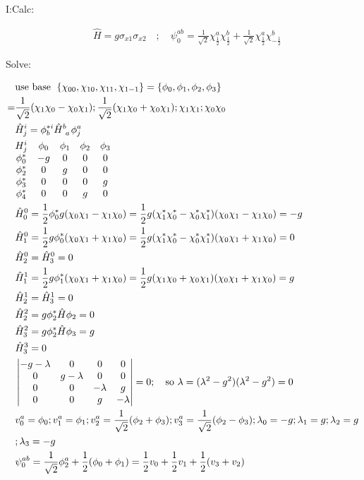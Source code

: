 \documentclass{article}
\begin{document}
I:Calc:

\begin{align*}
  &\hat H=g\sigma_{x1}\sigma_{x2}\quad;\quad\psi_0^{ab}=\frac1{\sqrt{2}}\chi_{\frac12}^a\chi_{\frac12}^b+\frac1{\sqrt{2}}\chi_{\frac12}^a\chi_{-\frac12}^b
\end{align*}

Solve:

\begin{align*}
&\text{use base }\;\{\chi_{00},\chi_{10},\chi_{11},\chi_{1-1}\}=\{\phi_0,\phi_1,\phi_2,\phi_3\}\\
  =&\frac1{\sqrt{2}}(\chi_1\chi_0-\chi_0\chi_1);\frac1{\sqrt{2}}(\chi_1\chi_0+\chi_0\chi_1);\chi_1\chi_1;\chi_0\chi_0\\
&\hat H^i_j=\phi^{*i}_b \tensor {\hat H}{^b_a}\phi_j^a\\
&\begin{matrix}
  H^i_j&\phi_0&\phi_1&\phi_2&\phi_3\\
  \phi^*_0&-g&0&0&0\\
  \phi^*_2&0&g&0&0\\
  \phi^*_3&0&0&0&g\\
  \phi^*_4&0&0&g&0
\end{matrix}\\
&\hat H^0_0=\frac12 \phi^*_0g(\chi_0\chi_1-\chi_1\chi_0)=\frac12g(\chi_1^*\chi_0^*-\chi_0^*\chi_1^*)(\chi_0\chi_1-\chi_1\chi_0)=-g\\
&\hat H^0_1=\frac12g\phi_0^*(\chi_0\chi_1+\chi_1\chi_0)=\frac12g(\chi_1^*\chi_0^*-\chi_0^*\chi_1^*)(\chi_0\chi_1+\chi_1\chi_0)=0\\
&\hat H^0_2=\hat H^0_3=0\\
&\hat H^1_1=\frac12g\phi^*_1(\chi_0\chi_1+\chi_1\chi_0)=\frac12g(\chi_1\chi_0+\chi_0\chi_1)(\chi_0\chi_1+\chi_1\chi_0)=g\\
&\hat H^1_2=\hat H^1_3=0\\
&\hat H^2_2=g\phi_2^*\hat H\phi_2=0\\
&\hat H^2_3=g\phi^*_2\hat H\phi_3=g\\
&\hat H^3_3=0\\
&\begin{vmatrix}
 -g-\lambda&0&0&0\\
 0&g-\lambda&0&0\\
 0&0&-\lambda&g\\
 0&0&g&-\lambda
\end{vmatrix}=0;\quad\text{so $\lambda$}=(\lambda^2-g^2)(\lambda^2-g^2)=0\\
&v_0^a=\phi_0;v_1^a=\phi_1;v_2^a=\frac1{\sqrt{2}}(\phi_2+\phi_3);v_3^a=\frac1{\sqrt{2}}(\phi_2-\phi_3);\lambda_0=-g;\lambda_1=g;\lambda_2=g\\&;\lambda_3=-g\\
&\psi_0^{ab}=\frac1{\sqrt{2}}\phi_2^a+\frac12(\phi_0+\phi_1)=\frac12v_0+\frac12v_1+\frac12(v_3+v_2)
\end{align*}
\end{document}
